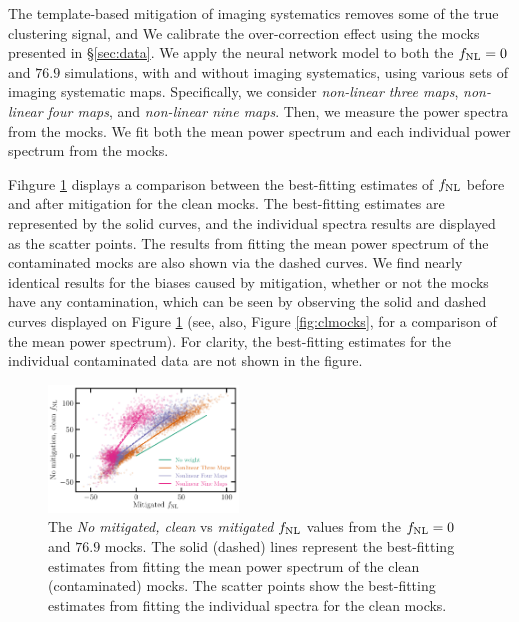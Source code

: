 The template-based mitigation of imaging systematics removes some of the true clustering signal, and   We calibrate the over-correction effect using the mocks presented in \S \ref{sec:data}.   We apply the neural network model to both the $f_{\rm NL}=0$ and $76.9$ simulations, with and without imaging systematics, using various sets of imaging systematic maps. Specifically, we consider \textit{non-linear three maps}, \textit{non-linear four maps}, and \textit{non-linear nine maps}. Then, we measure the power spectra from the mocks. We fit both the mean power spectrum and each individual power spectrum from the mocks. 

Fihgure \ref{fig:fnlbias} displays a comparison between the best-fitting estimates of $f_{\rm NL}$ before and after mitigation for the clean mocks. The best-fitting estimates  are represented by the solid curves, and the individual spectra results are displayed as the scatter points. The results from fitting the mean power spectrum of the contaminated mocks are also shown via the dashed curves. We find nearly identical results for the biases caused by mitigation, whether or not the mocks have any contamination, which can be seen by observing the solid and dashed curves displayed on Figure \ref{fig:fnlbias} (see, also, Figure \ref{fig:clmocks}, for a comparison of the mean power spectrum). For clarity, the best-fitting estimates for the individual contaminated data are not shown in the figure.

\begin{figure}
\centering
\includegraphics[width=0.45\textwidth]{figures/fnlbias}
\caption{The \textit{No mitigated, clean} vs \textit{mitigated} $f_{\rm NL}$ values from the $f_{\rm NL}=0$ and $76.9$ mocks. The solid (dashed) lines represent the best-fitting estimates from fitting the mean power spectrum of the clean (contaminated) mocks. The scatter points show the best-fitting estimates from fitting the individual spectra for the clean mocks.}\label{fig:fnlbias}
\end{figure}


